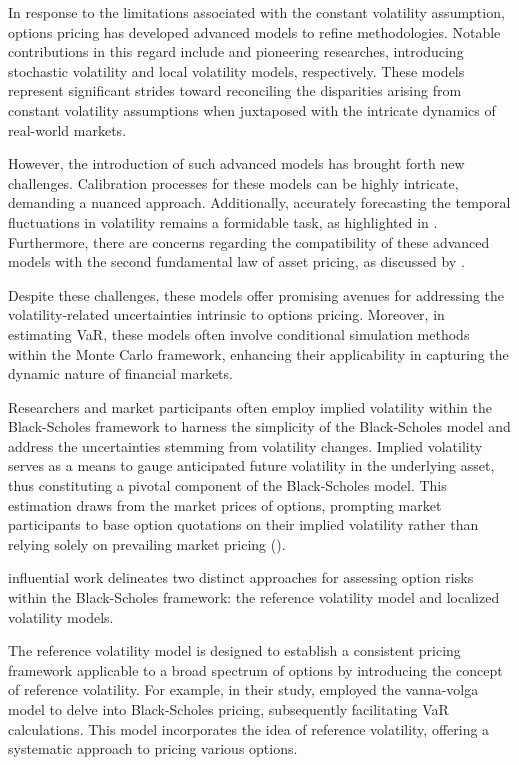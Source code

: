 In response to the limitations associated with the constant volatility assumption, options pricing has developed advanced models to refine methodologies. Notable contributions in this regard include \cite{hull1987pricing} and \cite{dupire1997pricing} pioneering researches, introducing stochastic volatility and local volatility models, respectively. These models represent significant strides toward reconciling the disparities arising from constant volatility assumptions when juxtaposed with the intricate dynamics of real-world markets.

However, the introduction of such advanced models has brought forth new challenges. Calibration processes for these models can be highly intricate, demanding a nuanced approach. Additionally, accurately forecasting the temporal fluctuations in volatility remains a formidable task, as highlighted in \cite{Verma2008ImpliedVM}. Furthermore, there are concerns regarding the compatibility of these advanced models with the second fundamental law of asset pricing, as discussed by \cite{clark2011foreign}.

Despite these challenges, these models offer promising avenues for addressing the volatility-related uncertainties intrinsic to options pricing. Moreover, in estimating VaR, these models often involve conditional simulation methods within the Monte Carlo framework, enhancing their applicability in capturing the dynamic nature of financial markets.

Researchers and market participants often employ implied volatility within the Black-Scholes framework to harness the simplicity of the Black-Scholes model and address the uncertainties stemming from volatility changes. Implied volatility serves as a means to gauge anticipated future volatility in the underlying asset, thus constituting a pivotal component of the Black-Scholes model. This estimation draws from the market prices of options, prompting market participants to base option quotations on their implied volatility rather than relying solely on prevailing market pricing (\cite{hull2003options}).

\cite{carr2020option} influential work delineates two distinct approaches for assessing option risks within the Black-Scholes framework: the reference volatility model and localized volatility models. 

The reference volatility model is designed to establish a consistent pricing framework applicable to a broad spectrum of options by introducing the concept of reference volatility. For example, in their study, \cite{mercuriovanna} employed the vanna-volga model to delve into Black-Scholes pricing, subsequently facilitating VaR calculations. This model incorporates the idea of reference volatility, offering a systematic approach to pricing various options.

